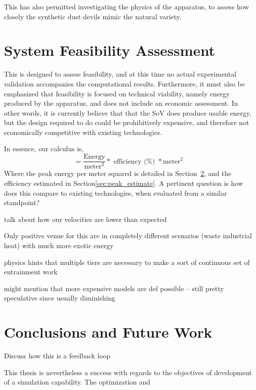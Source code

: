This has also permitted investigating the physics of the apparatus, to
assess how closely the synthetic dust devils mimic the natural
variety. 

%
%
\section{System Feasibility Assessment}


This is designed to assess feasibility, and at this time no 
actual experimental validation accompanies the computational
results. Furthermore, it must also be emphasized that feasibility is
focused on technical viability, namely energy produced by the apparatus,
and does not include an economic assessment. In other words, it is
currently believe that that the SoV does produce usable energy, 
but the design required to do could be prohibitively expensive, and
therefore not economically competitive with existing technologies. 


In essence, our calculus is, 
\begin{equation}
 = \frac{\text{Energy}}{\text{meter}^2} * \text{ efficiency (\%) } *
  \text{meter}^2 
\end{equation}
Where the peak energy per meter squared is detailed in Section~\ref{},
and the efficiency estimated in Section\ref{sec:peak_estimate}. A
pertinent question is how does this compare to existing technologies,
when evaluated from a similar standpoint?

talk about how our velocities are lower than expected



Only positive venue for this are in 
completely different scenarios (waste industrial heat)
with much more exotic energy

physics hints that multiple tiers are necessary to make a sort of
continuous set of entrainment work

might mention that more expensive models are def possible -- still pretty speculative since usually diminishing

\section{Conclusions and Future Work}

Discuss how this is a feedback loop

This thesis is nevertheless a success with regards to the objectives of
development of a simulation capability. The optimization and 

